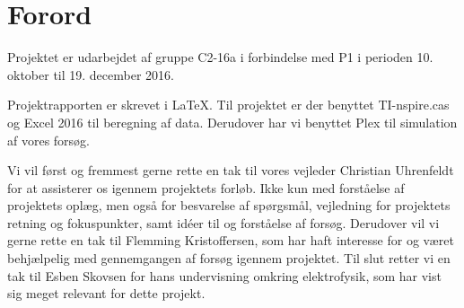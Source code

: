 \chapter{Forord}
Projektet er udarbejdet af gruppe C2-16a i forbindelse med P1 i perioden 10. oktober til 19. december 2016.

Projektrapporten er skrevet i \LaTeX. Til projektet er der benyttet TI-nspire.cas og Excel 2016 til beregning af data. Derudover har vi benyttet Plex til simulation af vores forsøg.

Vi vil først og fremmest gerne rette en tak til vores vejleder Christian Uhrenfeldt for at assisterer os igennem projektets forløb. Ikke kun med forståelse af projektets oplæg, men også for besvarelse af spørgsmål, vejledning for projektets retning og fokuspunkter, samt idéer til og forståelse af forsøg. Derudover vil vi gerne rette en tak til Flemming Kristoffersen, som har haft interesse for og været behjælpelig med gennemgangen af forsøg igennem projektet. Til slut retter vi en tak til Esben Skovsen for hans undervisning omkring elektrofysik, som har vist sig meget relevant for dette projekt.